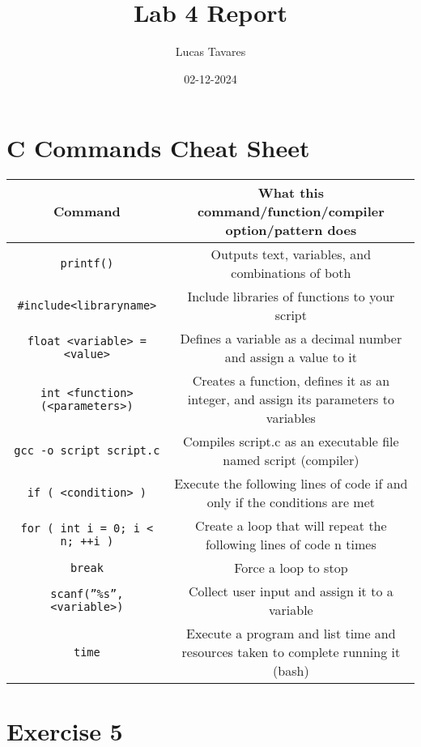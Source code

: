 \documentclass{article}
\title{Lab 4 Report}
\date{02-12-2024}
\author{Lucas Tavares}
\begin{document}
\maketitle


\newpage

\section{C Commands Cheat Sheet}

\begin{adjustbox}{max width=\textwidth}
\begin{tabular}{|c|c|}
\hline
Command & What this command/function/compiler option/pattern does \\
\hline
\hline
\texttt{printf()} & Outputs text, variables, and combinations of both \\
\hline
\texttt{\#include<libraryname>} & Include libraries of functions to your script \\
\hline
\texttt{float <variable> = <value>} & Defines a variable as a decimal number and assign a value to it \\
\hline
\texttt{int <function>(<parameters>)} & Creates a function, defines it as an integer, and assign its parameters to variables \\
\hline
\texttt{gcc -o script script.c} & Compiles script.c as an executable file named script (compiler) \\
\hline
\texttt{if ( <condition> )} & Execute the following lines of code if and only if the conditions are met \\
\hline
\texttt{for ( int i = 0; i < n; ++i )} & Create a loop that will repeat the following lines of code n times \\
\hline
\texttt{break} & Force a loop to stop \\
\hline
\texttt{scanf(''\%s'', <variable>)} & Collect user input and assign it to a variable \\
\hline
\texttt{time} & Execute a program and list time and resources taken to complete running it (bash) \\
\hline

\end{tabular}
\end{adjustbox}


\newpage

\section{Exercise 5}
\end{document}
